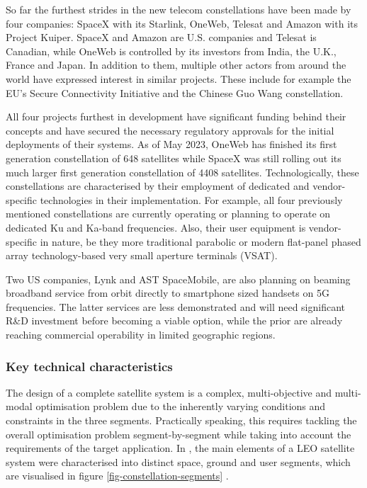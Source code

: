 \documentclass[english, 12pt, a4paper, elec, utf8, a-1b, online]{aaltothesis}
\begin{document}
So far the furthest strides in the new telecom constellations have been made by four companies: SpaceX with its Starlink, OneWeb, Telesat and Amazon with its Project Kuiper.
SpaceX and Amazon are U.S.
companies and Telesat is Canadian, while OneWeb is controlled by its investors from India, the U.K., France and Japan.
In addition to them, multiple other actors from around the world have expressed interest in similar projects.
These include for example the EU’s Secure Connectivity Initiative and the Chinese Guo Wang constellation.

All four projects furthest in development have significant funding behind their concepts and have secured the necessary regulatory approvals for the initial deployments of their systems.
As of May 2023, OneWeb has finished its first generation constellation of 648 satellites while SpaceX was still rolling out its much larger first generation constellation of 4408 satellites.
Technologically, these constellations are characterised by their employment of dedicated and vendor-specific technologies in their implementation.
For example, all four previously mentioned constellations are currently operating or planning to operate on dedicated Ku and Ka-band frequencies.
Also, their user equipment is vendor-specific in nature, be they more traditional parabolic or modern flat-panel phased array technology-based very small aperture terminals (VSAT).

Two US companies, Lynk and AST SpaceMobile, are also planning on beaming broadband service from orbit directly to smartphone sized handsets on 5G frequencies.
The latter services are less demonstrated and will need significant R\&D investment before becoming a viable option, while the prior are already reaching commercial operability in limited geographic regions.

\subsubsection{Key technical characteristics} \label{ch-constellation-characteristics}

The design of a complete satellite system is a complex, multi-objective and multi-modal optimisation problem due to the inherently varying conditions and constraints in the three segments.
Practically speaking, this requires tackling the overall optimisation problem segment-by-segment while taking into account the requirements of the target application.
In , the main elements of a LEO satellite system were characterised into distinct space, ground and user segments, which are visualised in figure \ref{fig-constellation-segments} \cite{celikbilek2022survey}.
\end{document}
